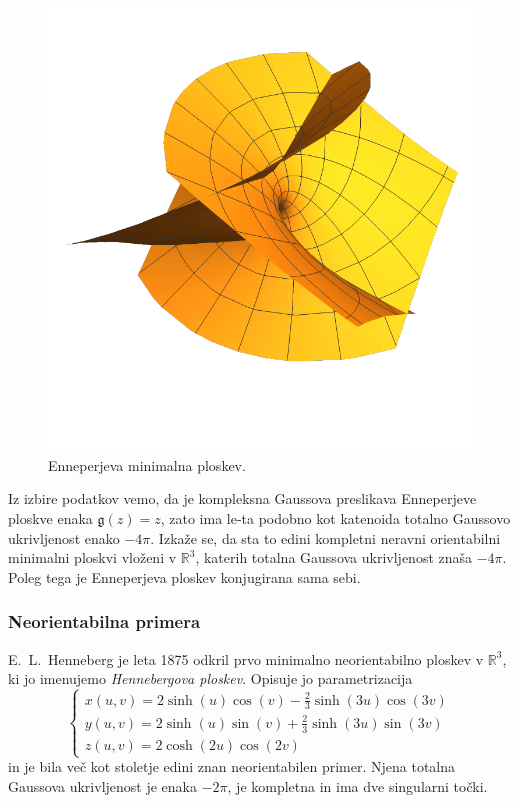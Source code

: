 \documentclass[12pt,a4paper,twoside]{article}
\theoremstyle{definition} %
\theoremstyle{plain} %
\numberwithin{equation}{section}  %
\newcommand{\R}{\mathbb R}
\begin{document}
\begin{figure}[h!]
\begin{center}
\includegraphics[scale=0.8]{images/enneper.pdf}
\caption{Enneperjeva minimalna ploskev.}
\end{center}
\end{figure}

Iz izbire podatkov vemo, da je kompleksna Gaussova preslikava Enneperjeve ploskve enaka $\mathfrak{g}(z) = z$, zato ima le-ta podobno kot katenoida totalno Gaussovo ukrivljenost enako $-4 \pi$. Izkaže se, da sta to edini kompletni neravni orientabilni minimalni ploskvi vloženi v $\mathbb{R}^3$, katerih totalna Gaussova ukrivljenost znaša $-4 \pi$. Poleg tega je Enneperjeva ploskev konjugirana sama sebi.

\subsubsection{Neorientabilna primera}
%
E.~L.~Henneberg je leta 1875 odkril prvo minimalno neorientabilno ploskev v $\R^3$, ki jo imenujemo \emph{Hennebergova ploskev}.
Opisuje jo parametrizacija
%
\begin{equation}
\begin{cases}
x(u,v) = 2 \sinh(u) \cos(v) -\frac{2}{3} \sinh(3u) \cos(3v) \\
y(u,v) = 2 \sinh(u) \sin(v) + \frac{2}{3} \sinh(3u) \sin(3v) \\
z(u,v) = 2 \cosh(2u) \cos(2v)
\end{cases}
\end{equation}
in je bila več kot stoletje edini znan neorientabilen primer. Njena totalna Gaussova ukrivljenost je enaka $-2 \pi$, je kompletna in ima dve singularni točki.
\end{document}
